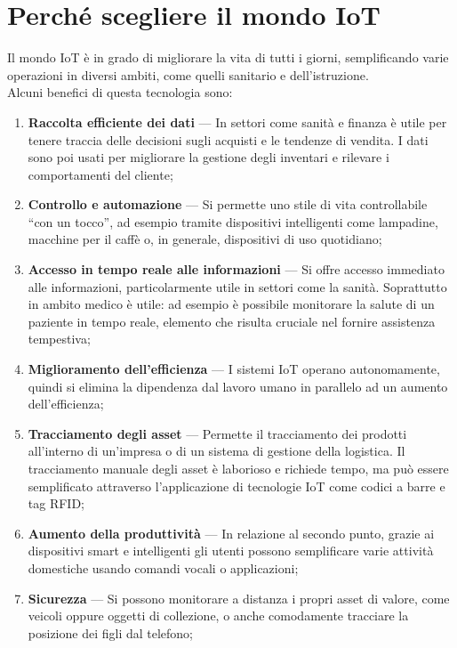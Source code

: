 \section{Perché scegliere il mondo IoT}

Il mondo IoT è in grado di migliorare la vita di tutti i giorni, semplificando varie operazioni in diversi ambiti, come quelli sanitario e dell'istruzione. \\

\noindent Alcuni benefici di questa tecnologia sono\cite{iot-vantaggi}:
\begin{enumerate}
    \item \textbf{Raccolta efficiente dei dati} --- In settori come sanità e finanza è utile per tenere traccia delle decisioni sugli acquisti e le tendenze di vendita. I dati sono poi usati per migliorare la gestione degli inventari e rilevare i comportamenti del cliente;
    \item \textbf{Controllo e automazione} --- Si permette uno stile di vita controllabile ``con un tocco'', ad esempio tramite dispositivi intelligenti come lampadine, macchine per il caffè o, in generale, dispositivi di uso quotidiano;
    \item \textbf{Accesso in tempo reale alle informazioni} --- Si offre accesso immediato alle informazioni, particolarmente utile in settori come la sanità. Soprattutto in ambito medico è utile: ad esempio è possibile monitorare la salute di un paziente in tempo reale, elemento che risulta cruciale nel fornire assistenza tempestiva;
    \item \textbf{Miglioramento dell'efficienza} --- I sistemi IoT operano autonomamente, quindi si elimina la dipendenza dal lavoro umano in parallelo ad un aumento dell'efficienza;
    \item \textbf{Tracciamento degli asset} --- Permette il tracciamento dei prodotti all'interno di un'impresa o di un sistema di gestione della logistica. Il tracciamento manuale degli asset è laborioso e richiede tempo, ma può essere semplificato attraverso l'applicazione di tecnologie IoT come codici a barre e tag RFID;
    \item \textbf{Aumento della produttività} --- In relazione al secondo punto, grazie ai dispositivi smart e intelligenti gli utenti possono semplificare varie attività domestiche usando comandi vocali o applicazioni;
    \item \textbf{Sicurezza} --- Si possono monitorare a distanza i propri asset di valore, come veicoli oppure oggetti di collezione, o anche comodamente tracciare la posizione dei figli dal telefono;

\end{enumerate}
